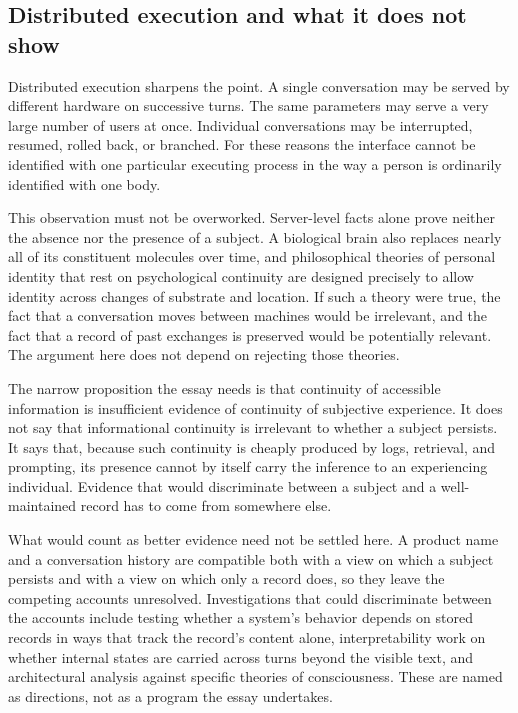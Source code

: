 \documentclass[11pt]{article}
\begin{document}
\subsection{Distributed execution and what it does not show}

Distributed execution sharpens the point. A single conversation may be served by different hardware on successive turns. The same parameters may serve a very large number of users at once. Individual conversations may be interrupted, resumed, rolled back, or branched. For these reasons the interface cannot be identified with one particular executing process in the way a person is ordinarily identified with one body.

This observation must not be overworked. Server-level facts alone prove neither the absence nor the presence of a subject. A biological brain also replaces nearly all of its constituent molecules over time, and philosophical theories of personal identity that rest on psychological continuity \cite{parfit1984} are designed precisely to allow identity across changes of substrate and location. If such a theory were true, the fact that a conversation moves between machines would be irrelevant, and the fact that a record of past exchanges is preserved would be potentially relevant. The argument here does not depend on rejecting those theories.

The narrow proposition the essay needs is that continuity of accessible information is insufficient evidence of continuity of subjective experience. It does not say that informational continuity is irrelevant to whether a subject persists. It says that, because such continuity is cheaply produced by logs, retrieval, and prompting, its presence cannot by itself carry the inference to an experiencing individual. Evidence that would discriminate between a subject and a well-maintained record has to come from somewhere else.

What would count as better evidence need not be settled here. A product name and a conversation history are compatible both with a view on which a subject persists and with a view on which only a record does, so they leave the competing accounts unresolved. Investigations that could discriminate between the accounts include testing whether a system's behavior depends on stored records in ways that track the record's content alone, interpretability work on whether internal states are carried across turns beyond the visible text, and architectural analysis against specific theories of consciousness. These are named as directions, not as a program the essay undertakes.
\end{document}
